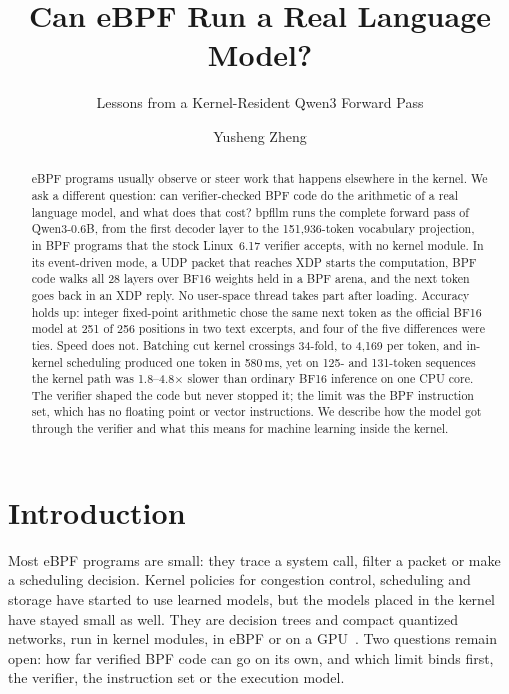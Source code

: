 \documentclass[sigconf,nonacm]{acmart}
\begin{document}
\title{Can eBPF Run a Real Language Model?}
\subtitle{Lessons from a Kernel-Resident Qwen3 Forward Pass}

\author{Yusheng Zheng}

\begin{abstract}
eBPF programs usually observe or steer work that happens elsewhere in the
kernel. We ask a different question: can verifier-checked BPF code do the
arithmetic of a real language model, and what does that cost? bpfllm runs the
complete forward pass of Qwen3-0.6B, from the first decoder layer to the
151,936-token vocabulary projection, in BPF programs that the stock
Linux~6.17 verifier accepts, with no kernel module. In its event-driven mode,
a UDP packet that reaches XDP starts the computation, BPF code walks all 28
layers over BF16 weights held in a BPF arena, and the next token goes back in
an XDP reply. No user-space thread takes part after loading. Accuracy holds
up: integer fixed-point arithmetic chose the same next token as the official
BF16 model at 251 of 256 positions in two text excerpts, and four of the five
differences were ties. Speed does not. Batching cut kernel crossings 34-fold,
to 4,169 per token, and in-kernel scheduling produced one token in 580\,ms,
yet on 125- and 131-token sequences the kernel path was 1.8--4.8$\times$
slower than ordinary BF16 inference on one CPU core. The verifier shaped the
code but never stopped it; the limit was the BPF instruction set, which has
no floating point or vector instructions. We describe how the model got
through the verifier and what this means for machine learning inside the
kernel.
\end{abstract}

\maketitle

\section{Introduction}

Most eBPF programs are small: they trace a system call, filter a packet or
make a scheduling decision. Kernel policies for congestion control,
scheduling and storage have started to use learned models, but the models
placed in the kernel have stayed small as well. They are decision trees and
compact quantized networks, run in kernel modules, in eBPF or on a
GPU~\cite{liteflow,lake,kml,bachl}. Two questions remain open: how far
verified BPF code can go on its own, and which limit binds first, the
verifier, the instruction set or the execution model.
\end{document}
